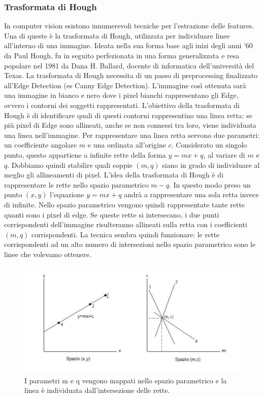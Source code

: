 \documentclass[twoside]{supsistudent}
\begin{document}
\subsubsection{Trasformata di Hough}
In computer vision esistono innumerevoli tecniche per l'estrazione delle features. Una 
di queste è la trasformata di Hough, utilizzata per individuare linee all'interno di una 
immagine. Ideata nella sua forma base agli inizi degli anni '60 da Paul Hough, fu in 
seguito perfezionata in una forma generalizzata e resa popolare nel 1981 da Dana H. 
Ballard, docente di informatica dell'università del Texas.
La trasformata di Hough necessita di un passo di preprocessing finalizzato all'Edge 
Detection (es Canny Edge Detection). L'immagine così ottenuta sarà una immagine in bianco e nero
dove i pixel bianchi rappresentano gli Edge, ovvero i contorni dei soggetti 
rappresentati. L'obiettivo della trasformata di Hough è di identificare quali di questi 
contorni rappresentino una linea retta: se più pixel di Edge sono allineati, anche se non 
connessi tra loro, viene individuata una linea nell'immagine.
Per rappresentare una linea retta servono due parametri: un coefficiente angolare $m$ e 
una ordinata all'origine $c$. Considerato un singolo punto, questo appartiene a infinite 
rette della forma $y=mx+q$, al variare di $m$ e $q$. Dobbiamo quindi stabilire quali coppie 
$(m,q)$ siano in grado di individuare al meglio gli allineamenti di pixel.
L'idea della trasformata di Hough è di rappresentare le rette nello spazio parametrico 
$m-q$. In questo modo preso un punto $(x,y)$ l'equazione $y=mx+q$ andrà a rappresentare 
una sola retta invece di infinite. Nello spazio parametrico vengono quindi rappresentate 
tante rette quanti sono i pixel di edge. Se queste rette si intersecano, i due punti 
corrispondenti dell'immagine risulteranno allineati sulla retta con i coefficienti 
$(m,q)$ corrispondenti. La tecnica sembra quindi funzionare: le rette corrispondenti ad 
un alto numero di intersezioni nello spazio parametrico sono le linee che volevamo 
ottenere.
\begin{figure}[H]
  \center
  \includegraphics[scale=0.38]{images/spazioMC.png}
  \caption{I parametri m e q vengono mappati nello spazio parametrico e la linea è 
  individuata dall'intersezione delle rette.}
\end{figure}
\end{document}
